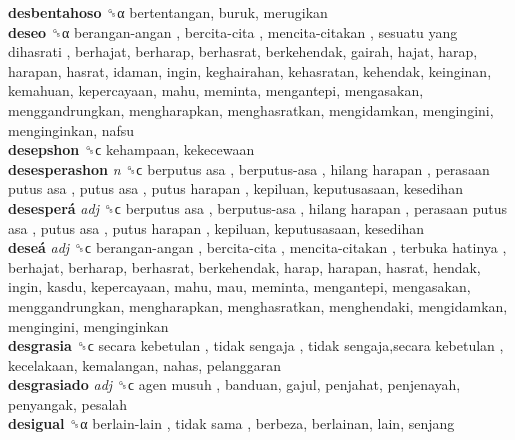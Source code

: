 \textbf{desbentahoso} ␝α  bertentangan, buruk, merugikan  \\
\textbf{deseo} ␝α   berangan-angan ,  bercita-cita ,  mencita-citakan ,  sesuatu yang dihasrati , berhajat, berharap, berhasrat, berkehendak, gairah, hajat, harap, harapan, hasrat, idaman, ingin, keghairahan, kehasratan, kehendak, keinginan, kemahuan, kepercayaan, mahu, meminta, mengantepi, mengasakan, menggandrungkan, mengharapkan, menghasratkan, mengidamkan, mengingini, menginginkan, nafsu  \\
\textbf{desepshon} ␝ϲ  kehampaan, kekecewaan  \\
\textbf{desesperashon} \emph{n}  ␝ϲ   berputus asa ,  berputus-asa ,  hilang harapan ,  perasaan putus asa ,  putus asa ,  putus harapan , kepiluan, keputusasaan, kesedihan  \\
\textbf{desesperá} \emph{adj}  ␝ϲ   berputus asa ,  berputus-asa ,  hilang harapan ,  perasaan putus asa ,  putus asa ,  putus harapan , kepiluan, keputusasaan, kesedihan  \\
\textbf{deseá} \emph{adj}  ␝ϲ   berangan-angan ,  bercita-cita ,  mencita-citakan ,  terbuka hatinya , berhajat, berharap, berhasrat, berkehendak, harap, harapan, hasrat, hendak, ingin, kasdu, kepercayaan, mahu, mau, meminta, mengantepi, mengasakan, menggandrungkan, mengharapkan, menghasratkan, menghendaki, mengidamkan, mengingini, menginginkan  \\
\textbf{desgrasia} ␝ϲ   secara kebetulan ,  tidak sengaja ,  tidak sengaja,secara kebetulan , kecelakaan, kemalangan, nahas, pelanggaran  \\
\textbf{desgrasiado} \emph{adj}  ␝ϲ   agen musuh , banduan, gajul, penjahat, penjenayah, penyangak, pesalah  \\
\textbf{desigual} ␝α   berlain-lain ,  tidak sama , berbeza, berlainan, lain, senjang  \\
